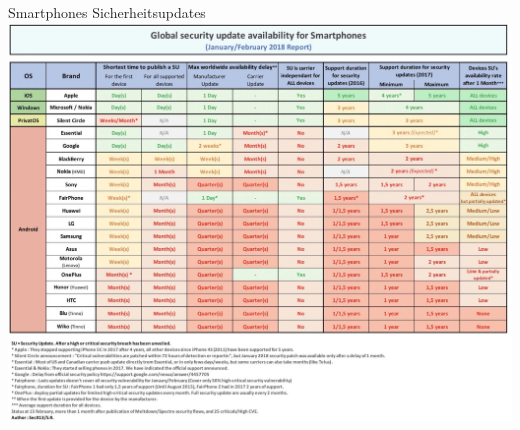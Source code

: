 \documentclass[10pt]{beamer}
\begin{document}
\begin{frame}[fragile]{Smartphones Sicherheitsupdates}
  \includegraphics[scale=0.5]{android_sub}
  \newline
\end{frame}





\end{document}

